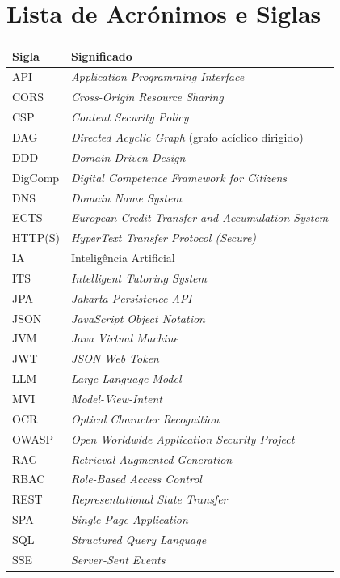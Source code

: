 \documentclass[a4paper,openright,twoside,11pt]{report}
\begin{document}
\chapter*{Lista de Acrónimos e Siglas}
\begin{center}
\begin{tabular}{ll}
\hline
\textbf{Sigla} & \textbf{Significado} \\
\hline
API     & \textit{Application Programming Interface} \\
CORS    & \textit{Cross-Origin Resource Sharing} \\
CSP     & \textit{Content Security Policy} \\
DAG     & \textit{Directed Acyclic Graph} (grafo acíclico dirigido) \\
DDD     & \textit{Domain-Driven Design} \\
DigComp & \textit{Digital Competence Framework for Citizens} \\
DNS     & \textit{Domain Name System} \\
ECTS    & \textit{European Credit Transfer and Accumulation System} \\
HTTP(S) & \textit{HyperText Transfer Protocol (Secure)} \\
IA      & Inteligência Artificial \\
ITS     & \textit{Intelligent Tutoring System} \\
JPA     & \textit{Jakarta Persistence API} \\
JSON    & \textit{JavaScript Object Notation} \\
JVM     & \textit{Java Virtual Machine} \\
JWT     & \textit{JSON Web Token} \\
LLM     & \textit{Large Language Model} \\
MVI     & \textit{Model-View-Intent} \\
OCR     & \textit{Optical Character Recognition} \\
OWASP   & \textit{Open Worldwide Application Security Project} \\
RAG     & \textit{Retrieval-Augmented Generation} \\
RBAC    & \textit{Role-Based Access Control} \\
REST    & \textit{Representational State Transfer} \\
SPA     & \textit{Single Page Application} \\
SQL     & \textit{Structured Query Language} \\
SSE     & \textit{Server-Sent Events} \\

\end{tabular}
\end{center}
\end{document}
